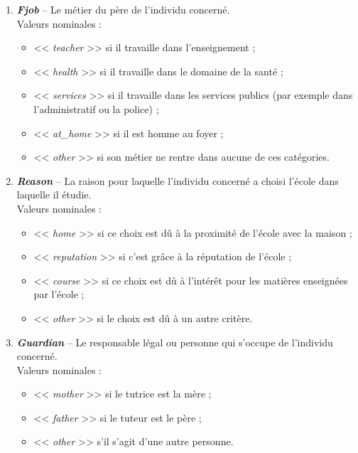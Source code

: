 \documentclass[11pt]{article}
\begin{document}
\begin{enumerate}
\item \textbf{\emph{Fjob}} \--- Le métier du père de l'individu concerné.
	\\\textsf{Valeurs nominales : }\begin{itemize}
	\item[\textbullet] << \emph{teacher} >> si il travaille dans l'enseignement ;
	\item[\textbullet] << \emph{health} >> si il travaille dans le domaine de la santé ;
	\item[\textbullet] << \emph{services} >> si il travaille dans les services publics (par exemple dans  l'administratif ou la police) ;
	\item[\textbullet] << \emph{at\_home} >> si il est homme au foyer ;
	\item[\textbullet] << \emph{other} >> si son métier ne rentre dans aucune de ces catégories.
	\end{itemize}

\item \textbf{\emph{Reason}} \--- La raison pour laquelle l'individu concerné a choisi l'école dans laquelle il étudie. 
	\\\textsf{Valeurs nominales : }\begin{itemize}
	\item[\textbullet] << \emph{home} >> si ce choix est dû à la proximité de l'école avec la maison ;
	\item[\textbullet] << \emph{reputation} >> si c'est grâce à la réputation de l'école ;
	\item[\textbullet] << \emph{course} >> si ce choix est dû à l'intérêt pour les matières enseignées par l'école ;
	\item[\textbullet] << \emph{other} >> si le choix est dû à un autre critère.
	\end{itemize}

\item \textbf{\emph{Guardian}} \--- Le responsable légal ou personne qui s'occupe de l'individu concerné. 
	\\\textsf{Valeurs nominales : }\begin{itemize}
	\item[\textbullet] << \emph{mother} >> si le tutrice est la mère ;
	\item[\textbullet] << \emph{father} >> si le tuteur est le père ;
	\item[\textbullet] << \emph{other} >> s'il s'agit d'une autre personne.
	\end{itemize}


\end{enumerate}
\end{document}
